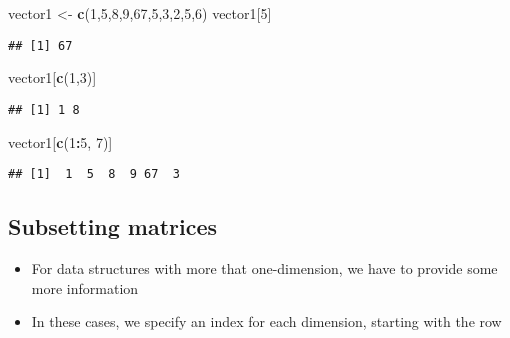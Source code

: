 \documentclass[]{article}
\newenvironment{Shaded}{\begin{snugshade}}{\end{snugshade}}
\newcommand{\KeywordTok}[1]{\textcolor[rgb]{0.13,0.29,0.53}{\textbf{#1}}}
\newcommand{\DecValTok}[1]{\textcolor[rgb]{0.00,0.00,0.81}{#1}}
\newcommand{\StringTok}[1]{\textcolor[rgb]{0.31,0.60,0.02}{#1}}
\newcommand{\OperatorTok}[1]{\textcolor[rgb]{0.81,0.36,0.00}{\textbf{#1}}}
\newcommand{\NormalTok}[1]{#1}
\providecommand{\tightlist}{%
  \setlength{\itemsep}{0pt}\setlength{\parskip}{0pt}}
\begin{document}
\begin{Shaded}
\begin{Highlighting}[]
\NormalTok{vector1 <-}\StringTok{ }\KeywordTok{c}\NormalTok{(}\DecValTok{1}\NormalTok{,}\DecValTok{5}\NormalTok{,}\DecValTok{8}\NormalTok{,}\DecValTok{9}\NormalTok{,}\DecValTok{67}\NormalTok{,}\DecValTok{5}\NormalTok{,}\DecValTok{3}\NormalTok{,}\DecValTok{2}\NormalTok{,}\DecValTok{5}\NormalTok{,}\DecValTok{6}\NormalTok{)}
\NormalTok{vector1[}\DecValTok{5}\NormalTok{]}
\end{Highlighting}
\end{Shaded}

\begin{verbatim}
## [1] 67
\end{verbatim}

\begin{Shaded}
\begin{Highlighting}[]
\NormalTok{vector1[}\KeywordTok{c}\NormalTok{(}\DecValTok{1}\NormalTok{,}\DecValTok{3}\NormalTok{)]}
\end{Highlighting}
\end{Shaded}

\begin{verbatim}
## [1] 1 8
\end{verbatim}

\begin{Shaded}
\begin{Highlighting}[]
\NormalTok{vector1[}\KeywordTok{c}\NormalTok{(}\DecValTok{1}\OperatorTok{:}\DecValTok{5}\NormalTok{, }\DecValTok{7}\NormalTok{)]}
\end{Highlighting}
\end{Shaded}

\begin{verbatim}
## [1]  1  5  8  9 67  3
\end{verbatim}

\subsection{Subsetting matrices}\label{subsetting-matrices}

\begin{itemize}
\tightlist
\item
  For data structures with more that one-dimension, we have to provide
  some more information
\item
  In these cases, we specify an index for each dimension, starting with
  the row
\end{itemize}
\end{document}
